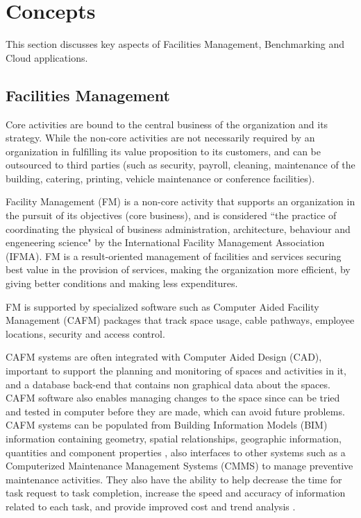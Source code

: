 
% 
% 

\section{Concepts}
\label{Concepts}

This section discusses key aspects of Facilities Management, Benchmarking and Cloud applications.

\subsection{Facilities Management}
\label{FacilitiesManagement}

Core activities are bound to the central business of the organization and its strategy. While the non-core activities are not necessarily required by an organization in fulfilling its value proposition to its customers, and can be outsourced to third parties (such as security, payroll, cleaning, maintenance of the building, catering, printing, vehicle maintenance or conference facilities). 

Facility Management (FM) is a non-core activity that supports an organization in the pursuit of its objectives (core business), and is considered ``the practice of coordinating the physical of business administration, architecture, behaviour and engeneering science" \cite{IFMA} by the International Facility Management Association (IFMA). FM is a result-oriented management of facilities and services securing best value in the provision of services, making the organization more efficient, by giving better conditions and making less expenditures.

FM is supported by specialized software such as Computer Aided Facility Management (CAFM) packages that track space usage, cable pathways, employee locations, security and access control.

CAFM systems are often integrated with Computer Aided Design (CAD), important to support the planning and monitoring of spaces and activities in it, and a database back-end that contains non graphical data about the spaces. CAFM software also enables managing changes to the space since can be tried and tested in computer before they are made, which can avoid future problems. 
CAFM systems can be populated from Building Information Models (BIM) information containing geometry, spatial relationships, geographic information, quantities and component properties \cite{Atkin2009}, also interfaces to other systems such as a Computerized Maintenance Management Systems (CMMS) to manage preventive maintenance activities. They also have the ability to help decrease the time for task request to task completion, increase the speed and accuracy of information related to each task, and provide improved cost and trend analysis \cite{May2012}. 

